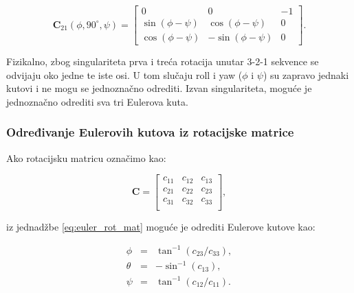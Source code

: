 \documentclass[times, utf8, diplomski, numeric]{templates/template}
\begin{document}
{{{{                \begin{equation}
                \boldsymbol{C}_{21}(\phi, 90^{\circ}, \psi) =
                \begin{bmatrix}
                    0                 & 0                  & -1 \\
                    \sin(\phi - \psi) & \cos(\phi - \psi)  &  0 \\
                    \cos(\phi - \psi) & -\sin(\phi - \psi) &  0
                \end{bmatrix}
                .
                \end{equation}

                Fizikalno, zbog singulariteta prva i treća rotacija unutar 3-2-1 sekvence se odvijaju oko jedne te iste osi. U tom slučaju roll i yaw ($\phi$ i $\psi$) su zapravo jednaki kutovi i ne mogu se jednoznačno odrediti. Izvan singulariteta, moguće je jednoznačno odrediti sva tri Eulerova kuta. 
            }

            \subsubsection{Određivanje Eulerovih kutova iz rotacijske matrice}{
                Ako rotacijsku matricu označimo kao:

                \begin{equation}
                \label{eq:rotation_matrix}
                \boldsymbol{C} =
                \begin{bmatrix}
                    c_{11} & c_{12} & c_{13} \\
                    c_{21} & c_{22} & c_{23} \\
                    c_{31} & c_{32} & c_{33} \\
                \end{bmatrix}
                ,
                \end{equation}

                iz jednadžbe \ref{eq:euler_rot_mat} moguće je odrediti Eulerove kutove kao:

                \begin{equation}
                \begin{array}{rcl}
                    \phi   & = & \tan^{-1}(c_{23}/c_{33}),\\
                    \theta & = & -\sin^{-1}(c_{13}),\\
                    \psi   & = & \tan^{-1}(c_{12}/c_{11}).
                \end{array}
                \end{equation}
            }

}}}
\end{document}
